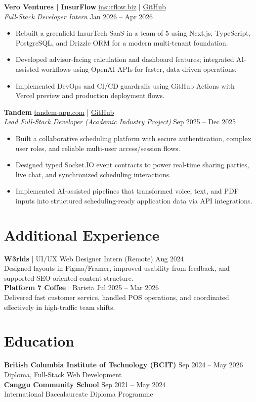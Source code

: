 \documentclass[10pt,letterpaper]{article}
\begin{document}
\textbf{Vero Ventures | InsurFlow} \hfill \href{https://insurflow.biz}{insurflow.biz} \;|\; \href{https://github.com/Vero-Ventures/insurflow}{GitHub} \\
\textit{Full-Stack Developer Intern} \hfill Jan 2026 -- Apr 2026 \\
\begin{itemize}
  \item Rebuilt a greenfield InsurTech SaaS in a team of 5 using Next.js, TypeScript, PostgreSQL, and Drizzle ORM for a modern multi-tenant foundation.
  \item Developed advisor-facing calculation and dashboard features; integrated AI-assisted workflows using OpenAI APIs for faster, data-driven operations.
  \item Implemented DevOps and CI/CD guardrails using GitHub Actions with Vercel preview and production deployment flows.
\end{itemize}

\textbf{Tandem} \hfill \href{https://tandem-app.com}{tandem-app.com} \;|\; \href{https://github.com/IDSP-TRADECARE/Tandem}{GitHub} \\
\textit{Lead Full-Stack Developer (Academic Industry Project)} \hfill Sep 2025 -- Dec 2025 \\
\begin{itemize}
  \item Built a collaborative scheduling platform with secure authentication, complex user roles, and reliable multi-user access/session flows.
  \item Designed typed Socket.IO event contracts to power real-time sharing parties, live chat, and synchronized scheduling interactions.
  \item Implemented AI-assisted pipelines that transformed voice, text, and PDF inputs into structured scheduling-ready application data via API integrations.
\end{itemize}

\section*{Additional Experience}
\textbf{W3rlds} | UI/UX Web Designer Intern (Remote) \hfill Aug 2024 \\
Designed layouts in Figma/Framer, improved usability from feedback, and supported SEO-oriented content structure. \\
\textbf{Platform 7 Coffee} | Barista \hfill Jul 2025 -- Mar 2026 \\
Delivered fast customer service, handled POS operations, and coordinated effectively in high-traffic team shifts.

\section*{Education}
\textbf{British Columbia Institute of Technology (BCIT)} \hfill Sep 2024 -- May 2026 \\
Diploma, Full-Stack Web Development \\
\textbf{Canggu Community School} \hfill Sep 2021 -- May 2024 \\
International Baccalaureate Diploma Programme
\end{document}
